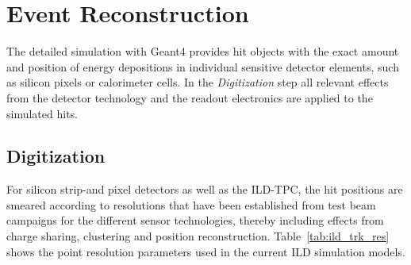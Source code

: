 \section{\label{sec:reco} Event Reconstruction}
The detailed simulation with Geant4 provides hit objects with the exact amount and position of energy
depositions in individual sensitive detector elements, such as silicon pixels or calorimeter cells.
In the \emph{Digitization} step all relevant effects from the detector technology and the readout electronics
are applied to the simulated hits.

\subsection{Digitization}
For silicon strip-and pixel detectors as well as the ILD-TPC, the hit positions are smeared according to
resolutions that have been established from test beam campaigns for the different sensor technologies,
thereby including effects from charge sharing, clustering and position reconstruction.
Table~\ref{tab:ild_trk_res} shows the point resolution parameters used in the current ILD simulation models.
%
